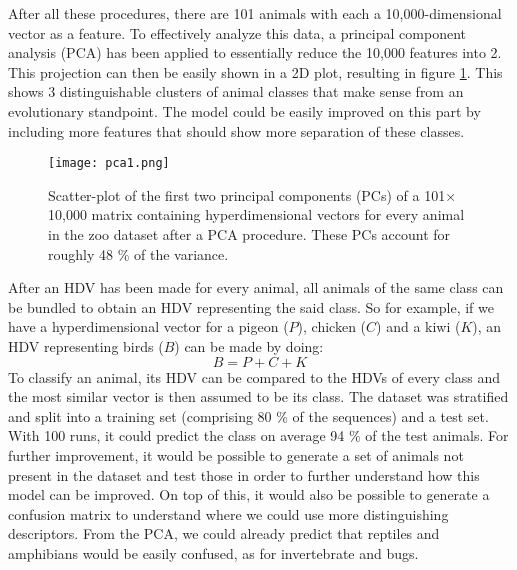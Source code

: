 After all these procedures, there are 101 animals with each a 10,000-dimensional vector as a feature. To effectively analyze this data, a principal component analysis (PCA) has been applied to essentially reduce the 10,000 features into 2. This projection can then be easily shown in a 2D plot, resulting in figure \ref{fig:exm2}. This shows 3 distinguishable clusters of animal classes that make sense from an evolutionary standpoint. The model could be easily improved on this part by including more features that should show more separation of these classes.
\begin{figure}[h]
    \centering
    \texttt{[image: pca1.png]}
    \caption{Scatter-plot of the first two principal components (PCs) of a 101$\times$10,000 matrix containing hyperdimensional vectors for every animal in the zoo dataset after a PCA procedure. These PCs account for roughly 48 \% of the variance.}
    \label{fig:exm2}
\end{figure}

After an HDV has been made for every animal, all animals of the same class can be bundled to obtain an HDV representing the said class. So for example, if we have a hyperdimensional vector for a pigeon ($P$), chicken ($C$) and a kiwi ($K$), an HDV representing birds ($B$) can be made by doing:
\begin{equation}
    B = P + C + K
\end{equation} 
To classify an animal, its HDV can be compared to the HDVs of every class and the most similar vector is then assumed to be its class. The dataset was stratified and split into a training set (comprising 80 \% of the sequences) and a test set. With 100 runs, it could predict the class on average 94 \% of the test animals. For further improvement, it would be possible to generate a set of animals not present in the dataset and test those in order to further understand how this model can be improved. On top of this, it would also be possible to generate a confusion matrix to understand where we could use more distinguishing descriptors. From the PCA, we could already predict that reptiles and amphibians would be easily confused, as for invertebrate and bugs.
